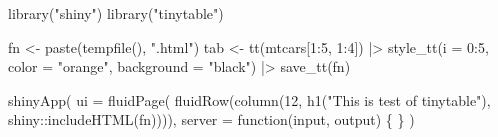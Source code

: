 \documentclass[
  letterpaper,
  DIV=11,
  numbers=noendperiod]{scrartcl}
\newenvironment{Shaded}{\begin{snugshade}}{\end{snugshade}}
\newcommand{\AttributeTok}[1]{\textcolor[rgb]{0.40,0.45,0.13}{#1}}
\newcommand{\ControlFlowTok}[1]{\textcolor[rgb]{0.00,0.23,0.31}{#1}}
\newcommand{\DecValTok}[1]{\textcolor[rgb]{0.68,0.00,0.00}{#1}}
\newcommand{\FunctionTok}[1]{\textcolor[rgb]{0.28,0.35,0.67}{#1}}
\newcommand{\NormalTok}[1]{\textcolor[rgb]{0.00,0.23,0.31}{#1}}
\newcommand{\OtherTok}[1]{\textcolor[rgb]{0.00,0.23,0.31}{#1}}
\newcommand{\SpecialCharTok}[1]{\textcolor[rgb]{0.37,0.37,0.37}{#1}}
\newcommand{\StringTok}[1]{\textcolor[rgb]{0.13,0.47,0.30}{#1}}
\begin{document}
\begin{Shaded}
\begin{Highlighting}[]
\FunctionTok{library}\NormalTok{(}\StringTok{"shiny"}\NormalTok{)}
\FunctionTok{library}\NormalTok{(}\StringTok{"tinytable"}\NormalTok{)}

\NormalTok{fn }\OtherTok{\textless{}{-}} \FunctionTok{paste}\NormalTok{(}\FunctionTok{tempfile}\NormalTok{(), }\StringTok{".html"}\NormalTok{)}
\NormalTok{tab }\OtherTok{\textless{}{-}} \FunctionTok{tt}\NormalTok{(mtcars[}\DecValTok{1}\SpecialCharTok{:}\DecValTok{5}\NormalTok{, }\DecValTok{1}\SpecialCharTok{:}\DecValTok{4}\NormalTok{]) }\SpecialCharTok{|\textgreater{}} 
  \FunctionTok{style\_tt}\NormalTok{(}\AttributeTok{i =} \DecValTok{0}\SpecialCharTok{:}\DecValTok{5}\NormalTok{, }\AttributeTok{color =} \StringTok{"orange"}\NormalTok{, }\AttributeTok{background =} \StringTok{"black"}\NormalTok{) }\SpecialCharTok{|\textgreater{}} 
  \FunctionTok{save\_tt}\NormalTok{(fn) }

\FunctionTok{shinyApp}\NormalTok{(}
  \AttributeTok{ui =} \FunctionTok{fluidPage}\NormalTok{(}
    \FunctionTok{fluidRow}\NormalTok{(}\FunctionTok{column}\NormalTok{(}\DecValTok{12}\NormalTok{, }\FunctionTok{h1}\NormalTok{(}\StringTok{"This is test of tinytable"}\NormalTok{), }
\NormalTok{                    shiny}\SpecialCharTok{::}\FunctionTok{includeHTML}\NormalTok{(fn)))), }
  \AttributeTok{server =} \ControlFlowTok{function}\NormalTok{(input, output) \{ }
\NormalTok{  \}}
\NormalTok{)}
\end{Highlighting}
\end{Shaded}
\end{document}
